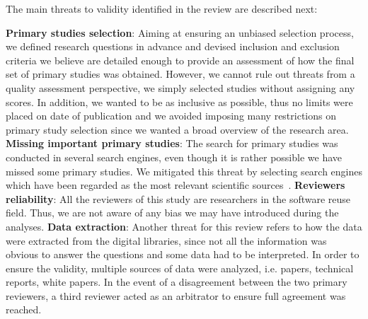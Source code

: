 The main threats to validity identified in the review are described next:

\textbf{Primary studies selection}: Aiming at ensuring an unbiased selection process, we defined research questions in advance and devised inclusion and exclusion criteria we believe are detailed enough to provide an assessment of how the final set of primary studies was obtained. However, we cannot rule out threats from a quality assessment perspective, we simply selected studies without assigning any scores. In addition, we wanted to be as inclusive as possible, thus no limits were placed on date of publication and we avoided imposing many restrictions on primary study selection since we wanted a broad overview of the research area. \textbf{Missing important primary studies}: The search for primary studies was conducted in several search engines, even though it is rather possible we have missed some primary studies. We mitigated this threat by selecting search engines which have been regarded as the most relevant scientific sources~\cite{Kitchenham}. \textbf{Reviewers reliability}: All the reviewers of this study are researchers in the software reuse field. Thus, we are not aware of any bias we may have introduced during the analyses. \textbf{Data extraction}: Another threat for this review refers to how the data were extracted from the digital libraries, since not all the information was obvious to answer the questions and some data had to be interpreted. In order to ensure the validity, multiple sources of data were analyzed, i.e. papers, technical reports, white papers. In the event of a disagreement between the two primary reviewers, a third reviewer acted as an arbitrator to ensure full agreement was reached.